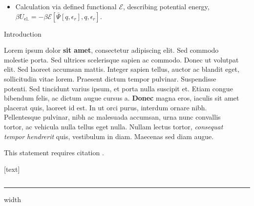 \documentclass{beamer}
\newlength{\sepwid}
\newlength{\onecolwid}
\begin{document}
\begin{frame}[t]{}
\begin{columns}[t]
\begin{column}{\onecolwid}
{\begin{itemize}
                                                         \begin{itemize}
                                                                 \normalsize
                                                                 \item Calculation via defined functional $\mathcal{E}$, describing potential energy, $\beta U_{\mathrm{el.}} = - \beta \mathcal{E}[\bar{\Psi}[q,\epsilon_r],q,\epsilon_r].$
                                                         \end{itemize}
                                         \end{itemize}
                                 }
				\begin{block}{Introduction}

			Lorem ipsum dolor \textbf{sit amet}, consectetur adipiscing elit. Sed commodo molestie porta. Sed ultrices scelerisque sapien ac commodo. Donec ut volutpat elit. Sed laoreet accumsan mattis. Integer sapien tellus, auctor ac blandit eget, sollicitudin vitae lorem. Praesent dictum tempor pulvinar. Suspendisse potenti. Sed tincidunt varius ipsum, et porta nulla suscipit et. Etiam congue bibendum felis, ac dictum augue cursus a. \textbf{Donec} magna eros, iaculis sit amet placerat quis, laoreet id est. In ut orci purus, interdum ornare nibh. Pellentesque pulvinar, nibh ac malesuada accumsan, urna nunc convallis tortor, ac vehicula nulla tellus eget nulla. Nullam lectus tortor, \textit{consequat tempor hendrerit} quis, vestibulum in diam. Maecenas sed diam augue.

			This statement requires citation \cite{Smith:2012qr}.

			\begin{minipage}{1\textwidth}
                                         [text]
                                         
                                         
                         \end{minipage}
				\end{block}
			\end{column}
			\begin{column}{\sepwid}\end{column}

		\end{columns}
		\vspace{1cm}
		\vfill
		\color{mpg-green}
		\hrule height 4pt width \textwidth
		\color{black}
	\end{frame}
\end{document}
